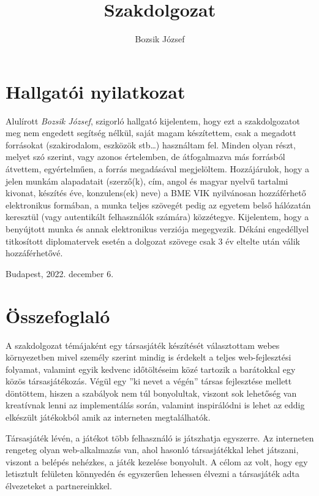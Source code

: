 \documentclass[a4paper,twoside]{article}
\title{Szakdolgozat}
\author{Bozsik József}
\begin{document}
\maketitle
\newpage
\tableofcontents
\newpage
{
\section*{Hallgatói nyilatkozat}}
Alulírott \textit{Bozsik József}, szigorló hallgató kijelentem, hogy ezt a szakdolgozatot meg
nem engedett segítség nélkül, saját magam készítettem, csak a megadott forrásokat (szakirodalom, eszközök stb\ldots) használtam fel. Minden olyan részt, melyet szó szerint, vagy
azonos értelemben, de átfogalmazva más forrásból átvettem, egyértelműen, a forrás megadásával megjelöltem.
Hozzájárulok, hogy a jelen munkám alapadatait (szerző(k), cím, angol és magyar
nyelvű tartalmi kivonat, készítés éve, konzulens(ek) neve) a BME VIK nyilvánosan hozzáférhető elektronikus formában, a munka teljes szövegét pedig az egyetem belső hálózatán
keresztül (vagy autentikált felhasználók számára) közzétegye. Kijelentem, hogy a benyújtott munka és annak elektronikus verziója megegyezik. Dékáni engedéllyel titkosított diplomatervek esetén a dolgozat szövege csak 3 év eltelte után válik hozzáférhetővé.
\begin{flushleft}
	Budapest, 2022. december 6.
\end{flushleft}

\newpage
\section{Összefoglaló}
A szakdolgozat témájaként egy társasjáték készítését választottam webes környezetben mivel személy szerint mindig is érdekelt a teljes web-fejlesztési folyamat, valamint egyik kedvenc időtöltéseim közé tartozik a barátokkal egy közös társasjátékozás. 
Végül egy ''ki nevet a végén'' társas fejlesztése mellett döntöttem, hiszen a szabályok nem túl bonyolultak, viszont sok lehetőség van kreatívnak lenni az implementálás során, valamint inspirálódni is lehet az eddig elkészült játékokból amik az interneten megtalálhatók.

Társasjáték lévén, a játékot több felhasználó is játszhatja egyszerre.  Az interneten rengeteg olyan web-alkalmazás van, ahol hasonló társasjátékkal
lehet játszani, viszont a belépés nehézkes, a játék kezelése bonyolult. A célom az volt, hogy
egy letisztult felületen könnyedén és egyszerűen lehessen élvezni a társasjáték adta
élvezeteket a partnereinkkel.
\end{document}
